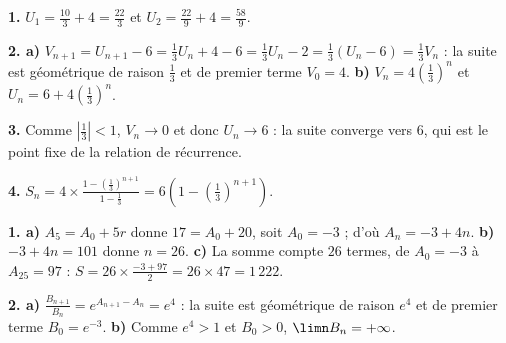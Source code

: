 \begin{corrige}
\textbf{1.} $U_{1} = \frac{10}{3}+4 = \frac{22}{3}$ et
$U_{2} = \frac{22}{9}+4 = \frac{58}{9}$.

\textbf{2. a)} $V_{n+1} = U_{n+1}-6 = \frac13U_{n}+4-6 = \frac13U_{n}-2
= \frac13\left(U_{n}-6\right) = \frac13V_{n}$ : la suite est géométrique de
raison $\frac13$ et de premier terme $V_{0} = 4$.
\textbf{b)} $V_{n} = 4\left(\frac13\right)^{n}$ et
$U_{n} = 6+4\left(\frac13\right)^{n}$.

\textbf{3.} Comme $\left|\frac13\right|<1$, $V_{n} \to 0$ et donc
$U_{n} \to 6$ : la suite converge vers $6$, qui est le point fixe de la
relation de récurrence.

\textbf{4.} $S_{n} = 4\times\frac{1-\left(\frac13\right)^{n+1}}{1-\frac13}
= 6\left(1-\left(\frac13\right)^{n+1}\right)$.
\end{corrige}

\begin{corrige}
\textbf{1. a)} $A_{5} = A_{0}+5r$ donne $17 = A_{0}+20$, soit
$A_{0} = -3$ ; d'où $A_{n} = -3+4n$.
\textbf{b)} $-3+4n = 101$ donne $n = 26$.
\textbf{c)} La somme compte $26$ termes, de $A_{0} = -3$ à
$A_{25} = 97$ : $S = 26\times\frac{-3+97}{2} = 26\times47 = 1\,222$.

\textbf{2. a)} $\frac{B_{n+1}}{B_{n}} = e^{A_{n+1}-A_{n}} = e^{4}$ : la
suite est géométrique de raison $e^{4}$ et de premier terme
$B_{0} = e^{-3}$.
\textbf{b)} Comme $e^{4}>1$ et $B_{0}>0$, $\limn B_{n} = +\infty$.
\end{corrige}


